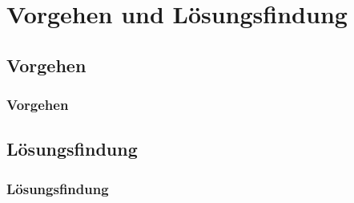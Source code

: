 \section{Vorgehen und Lösungsfindung} %
\subsection{Vorgehen}
\begin{frame}
    \frametitle{Vorgehen}
\end{frame}
\subsection{Lösungsfindung}
\begin{frame}
    \frametitle{Lösungsfindung}
\end{frame}
